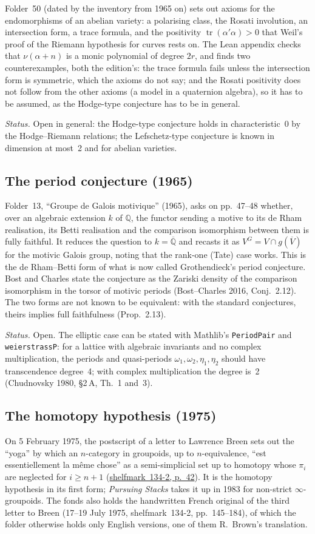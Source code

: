 \documentclass[11pt,a4paper]{article}
\newcommand{\lot}[3]{\href{https://grothendieck.commutator.io/\##1/#2}{shelfmark~#1, p.~#3}}
\newcommand{\q}[1]{“#1”}
\begin{document}
Folder~50 (dated by the inventory from 1965 on) sets out axioms for the
endomorphisms of an abelian variety: a polarising class, the Rosati involution,
an intersection form, a trace formula, and the positivity $\operatorname{tr}(\alpha'\alpha) > 0$
that Weil's proof of the Riemann hypothesis for curves rests on. The Lean
appendix checks that $\nu(\alpha+n)$ is a monic polynomial of degree $2r$, and finds two
counterexamples, both the edition's: the trace formula fails unless the
intersection form is symmetric, which the axioms do not say; and the Rosati
positivity does not follow from the other axioms (a model in a quaternion
algebra), so it has to be assumed, as the Hodge-type conjecture has to be in
general.

\emph{Status.} Open in general: the Hodge-type conjecture holds in
characteristic~0 by the Hodge--Riemann relations; the Lefschetz-type
conjecture is known in dimension at most~2 and for abelian varieties.

\subsection{The period conjecture (1965)}
Folder~13, \q{Groupe de Galois motivique} (1965), asks on pp.~47--48 whether,
over an algebraic extension $k$ of $\mathbb{Q}$, the functor sending a motive
to its de Rham realisation, its Betti realisation and the comparison
isomorphism between them is fully faithful. It reduces the question to
$k = \overline{\mathbb Q}$ and recasts it as $V^G = V \cap g(\overline V)$ for
the motivic Galois group, noting that the rank-one (Tate) case works. This is
the de Rham--Betti form of what is now called Grothendieck's period conjecture.
Bost and Charles state the conjecture as the Zariski density of the comparison
isomorphism in the torsor of motivic periods (Bost--Charles 2016, Conj.~2.12).
The two forms are not known to be equivalent: with the standard conjectures,
theirs implies full faithfulness (Prop.~2.13).

\emph{Status.} Open. The elliptic case can be stated with Mathlib's
\texttt{PeriodPair} and \texttt{weierstrassP}: for a lattice with algebraic
invariants and no complex multiplication, the periods and quasi-periods
$\omega_1, \omega_2, \eta_1, \eta_2$ should have transcendence degree~4; with
complex multiplication the degree is~2 (Chudnovsky 1980, \S2\,A, Th.~1 and~3).

\subsection{The homotopy hypothesis (1975)}
On 5 February 1975, the postscript of a letter to Lawrence Breen sets out the
\q{yoga} by which an $n$-category in groupoids, up to $n$-equivalence,
\q{est essentiellement la même chose} as a semi-simplicial set up to homotopy
whose $\pi_i$ are neglected for $i \geq n+1$ (\lot{134-2}{3}{42}). It is the
homotopy hypothesis in its first form; \emph{Pursuing Stacks} takes it up in
1983 for non-strict $\infty$-groupoids. The fonds also holds the handwritten
French original of the third letter to Breen (17--19 July 1975,
shelfmark~134-2, pp.~145--184), of which the folder otherwise holds only English versions, one of them
R.~Brown's translation.
\end{document}
